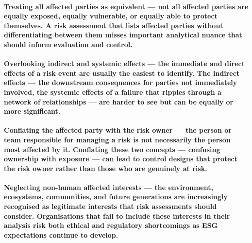 \paragraph{\textbf{Treating all affected parties as equivalent} — not all affected parties are equally exposed, equally vulnerable, or equally able to protect themselves. A risk assessment that lists affected parties without differentiating between them misses important analytical nuance that should inform evaluation and control.}
\paragraph{\textbf{Overlooking indirect and systemic effects} — the immediate and direct effects of a risk event are usually the easiest to identify. The indirect effects — the downstream consequences for parties not immediately involved, the systemic effects of a failure that ripples through a network of relationships — are harder to see but can be equally or more significant.}
\paragraph{\textbf{Conflating the affected party with the risk owner} — the person or team responsible for managing a risk is not necessarily the person most affected by it. Conflating these two concepts — confusing ownership with exposure — can lead to control designs that protect the risk owner rather than those who are genuinely at risk.}
\paragraph{\textbf{Neglecting non-human affected interests} — the environment, ecosystems, communities, and future generations are increasingly recognised as legitimate interests that risk assessments should consider. Organisations that fail to include these interests in their analysis risk both ethical and regulatory shortcomings as ESG expectations continue to develop.}

